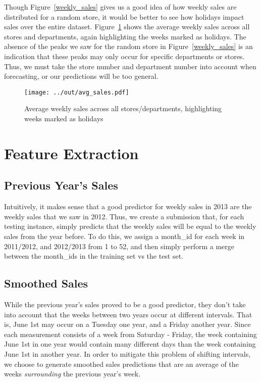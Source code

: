\documentclass{article}
\begin{document}
Though Figure~\ref{weekly_sales} gives us a good idea of how weekly sales are distributed for a random store, it would be better to see how holidays impact sales over the entire dataset. Figure~\ref{avg_sales} shows the average weekly sales across all stores and departments, again highlighting the weeks marked as holidays. The absence of the peaks we saw for the random store in Figure~\ref{weekly_sales} is an indication that these peaks may only occur for specific departments or stores. Thus, we must take the store number and department number into account when forecasting, or our predictions will be too general.

\begin{figure}[H]
    \centering
    \captionsetup{width=.6\textwidth}
    \texttt{[image: ../out/avg\_sales.pdf]}
    \caption{Average weekly sales across all stores/departments, highlighting weeks marked as holidays}
    \label{avg_sales}
\end{figure}

\section{Feature Extraction}

\subsection{Previous Year's Sales}
Intuitively, it makes sense that a good predictor for weekly sales in 2013 are the weekly sales that we saw in 2012. Thus, we create a submission that, for each testing instance, simply predicts that the weekly sales will be equal to the weekly sales from the year before. To do this, we assign a month\_id for each week in 2011/2012, and 2012/2013 from 1 to 52, and then simply perform a merge between the month\_ids in the training set vs the test set. 

\subsection{Smoothed Sales}
While the previous year's sales proved to be a good predictor, they don't take into account that the weeks between two years occur at different intervals. That is, June 1st may occur on a Tuesday one year, and a Friday another year. Since each measurement consists of a week from Saturday - Friday, the week containing June 1st in one year would contain many different days than the week containing June 1st in another year. In order to mitigate this problem of shifting intervals, we choose to generate smoothed sales predictions that are an average of the weeks \emph{surrounding} the previous year's week.
\end{document}
